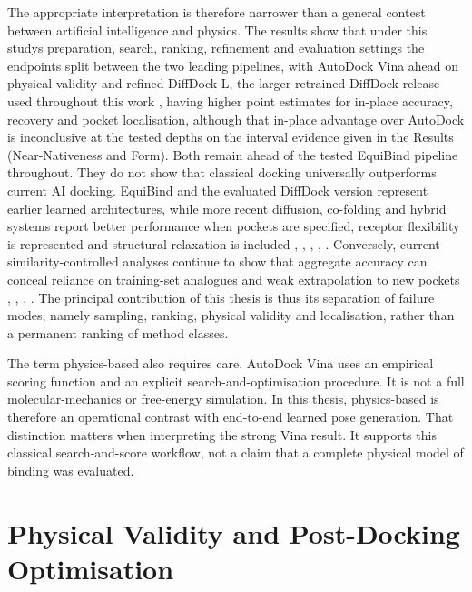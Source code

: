 The appropriate interpretation is therefore narrower than a general contest between artificial intelligence and physics. The results show that under this study\textquotesingle s preparation, search, ranking, refinement and evaluation settings the endpoints split between the two leading pipelines, with AutoDock Vina ahead on physical validity and refined DiffDock-L, the larger retrained DiffDock release used throughout this work \cite{ref091}, having higher point estimates for in-place accuracy, recovery and pocket localisation, although that in-place advantage over AutoDock is inconclusive at the tested depths on the interval evidence given in the Results (Near-Nativeness and Form). Both remain ahead of the tested EquiBind pipeline throughout. They do not show that classical docking universally outperforms current AI docking. EquiBind and the evaluated DiffDock version represent earlier learned architectures, while more recent diffusion, co-folding and hybrid systems report better performance when pockets are specified, receptor flexibility is represented and structural relaxation is included \cite{ref012}, \cite{ref013}, \cite{ref031}, \cite{ref064}, \cite{ref069}. Conversely, current similarity-controlled analyses continue to show that aggregate accuracy can conceal reliance on training-set analogues and weak extrapolation to new pockets \cite{ref035}, \cite{ref063}, \cite{ref065}, \cite{ref069}. The principal contribution of this thesis is thus its separation of failure modes, namely sampling, ranking, physical validity and localisation, rather than a permanent ranking of method classes.

The term physics-based also requires care. AutoDock Vina uses an empirical scoring function and an explicit search-and-optimisation procedure. It is not a full molecular-mechanics or free-energy simulation. In this thesis, physics-based is therefore an operational contrast with end-to-end learned pose generation. That distinction matters when interpreting the strong Vina result. It supports this classical search-and-score workflow, not a claim that a complete physical model of binding was evaluated.

\hypertarget{physical-validity-and-post-docking-optimisation}{%
\section{Physical Validity and Post-Docking Optimisation}\label{physical-validity-and-post-docking-optimisation}}


